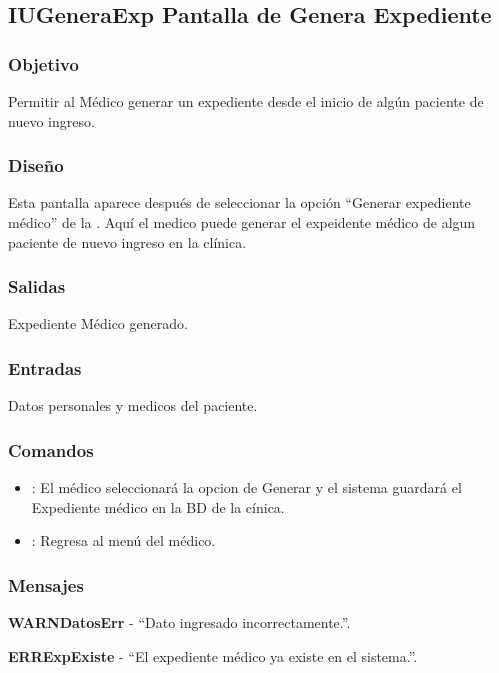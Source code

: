 \subsection{IUGeneraExp Pantalla de Genera Expediente}

\subsubsection{Objetivo}
	Permitir al M\'edico generar un expediente desde el inicio de alg\'un paciente de nuevo ingreso.

\subsubsection{Diseño}
	Esta pantalla aparece despu\'es de seleccionar la opci\'on "`Generar expediente m\'edico"' de la \label{IUMedico}. Aqu\'i el medico puede generar el expeidente m\'edico de algun paciente de nuevo ingreso en la cl\'inica.


\subsubsection{Salidas}

	Expediente M\'edico generado.

\subsubsection{Entradas}
Datos personales y medicos del paciente.

\subsubsection{Comandos}
\begin{itemize}
		\item {}: El m\'edico seleccionar\'a la opcion de Generar y el sistema guardar\'a el Expediente m\'edico en la BD de la c\'inica.
		\item {}: Regresa al men\'u del m\'edico.
\end{itemize}

\subsubsection{Mensajes}
	\begin{Citemize}
		\item {\bf WARNDatosErr} - "`Dato ingresado incorrectamente."'.
		\item {\bf ERRExpExiste} - "`El expediente m\'edico ya existe en el sistema."'.
	\end{Citemize}